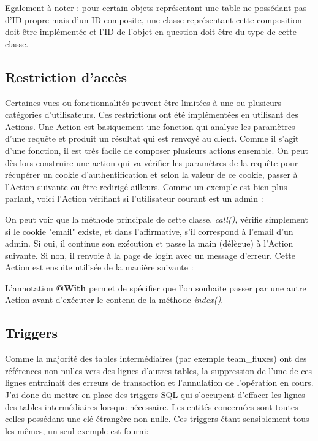 \documentclass[french]{article}
\begin{document}
Egalement à noter : pour certain objets représentant une table ne possédant pas d'ID propre mais d'un ID composite, une classe représentant cette composition doit être implémentée et l'ID de l'objet en question doit être du type de cette classe.

\subsection{Restriction d'accès}

Certaines vues ou fonctionnalités peuvent être limitées à une ou plusieurs catégories d'utilisateurs. Ces restrictions ont été implémentées en utilisant des Actions. Une Action est basiquement une fonction qui analyse les paramètres d'une requête et produit un résultat qui est renvoyé au client. Comme il s'agit d'une fonction, il est très facile de composer plusieurs actions ensemble. On peut dès lors construire une action qui va vérifier les paramètres de la requête pour récupérer un cookie d'authentification et selon la valeur de ce cookie, passer à l'Action suivante ou être redirigé ailleurs. Comme un exemple est bien plus parlant, voici l'Action vérifiant si l'utilisateur courant est un admin :



On peut voir que la méthode principale de cette classe, \textit{call()}, vérifie simplement si le cookie "email" existe, et dans l'affirmative, s'il correspond à l'email d'un admin. Si oui, il continue son exécution et passe la main (délègue) à l'Action suivante. Si non, il renvoie à la page de login avec un message d'erreur. Cette Action est ensuite utilisée de la manière suivante :

\newpage


L'annotation \textbf{@With} permet de spécifier que l'on souhaite passer par une autre Action avant d'exécuter le contenu de la méthode \textit{index()}.

\subsection{Triggers}

Comme la majorité des tables intermédiaires (par exemple team\_fluxes) ont des références non nulles vers des lignes d'autres tables, la suppression de l'une de ces lignes entrainait des erreurs de transaction et l'annulation de l'opération en cours. J'ai donc du mettre en place des triggers SQL qui s'occupent d'effacer les lignes des tables intermédiaires lorsque nécessaire. Les entités concernées sont toutes celles possédant une clé étrangère non nulle. Ces triggers étant sensiblement tous les mêmes, un seul exemple est fourni:
\end{document}
